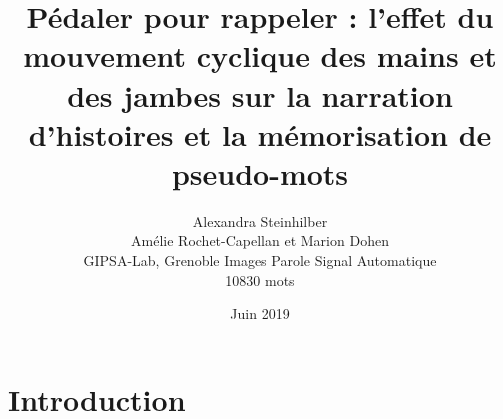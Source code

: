 \documentclass{article}
\title{Pédaler pour rappeler : l’effet du mouvement cyclique des mains et des jambes sur la narration d’histoires et la mémorisation de pseudo-mots}
\author{Alexandra Steinhilber\\ Amélie Rochet-Capellan et Marion Dohen \\ GIPSA-Lab, Grenoble Images Parole Signal Automatique \\ 10830 mots}
\date{Juin 2019}
\begin{document}
\section{Introduction}

\end{document}

